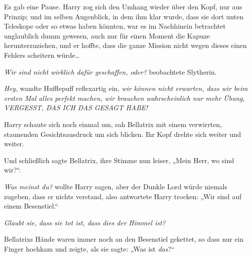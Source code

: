 Es gab eine Pause. Harry zog sich den Umhang wieder über den Kopf, nur aus Prinzip; und im selben Augenblick, in dem ihm klar wurde, dass sie dort unten Teleskope oder so etwas haben könnten, war es im Nachhinein betrachtet unglaublich dumm gewesen, auch nur für einen Moment die Kapuze herunterzuziehen, und er hoffte, dass die ganze Mission nicht wegen dieses einen Fehlers scheitern würde…

\emph{Wir sind nicht wirklich dafür geschaffen, oder?} beobachtete Slytherin.

\emph{Hey}, wandte Hufflepuff reflexartig ein, \emph{wir können nicht erwarten, dass wir beim ersten Mal alles perfekt machen, wir brauchen wahrscheinlich nur mehr Übung, VERGESST, DAS ICH DAS GESAGT HABE!}

Harry schaute sich noch einmal um, sah Bellatrix mit einem verwirrten, staunenden Gesichtsausdruck um sich blicken. Ihr Kopf drehte sich weiter und weiter.

Und schließlich sagte Bellatrix, ihre Stimme nun leiser, „Mein Herr, wo sind wir?“.

\emph{Was meinst du?} wollte Harry sagen, aber der Dunkle Lord würde niemals zugeben, dass er nichts verstand, also antwortete Harry trocken: „Wir sind auf einem Besenstiel.“

\emph{Glaubt sie, dass sie tot ist, dass dies der Himmel ist?}

Bellatrixs Hände waren immer noch an den Besenstiel gekettet, so dass nur ein Finger hochkam und zeigte, als sie sagte: „Was ist \emph{das}?“

